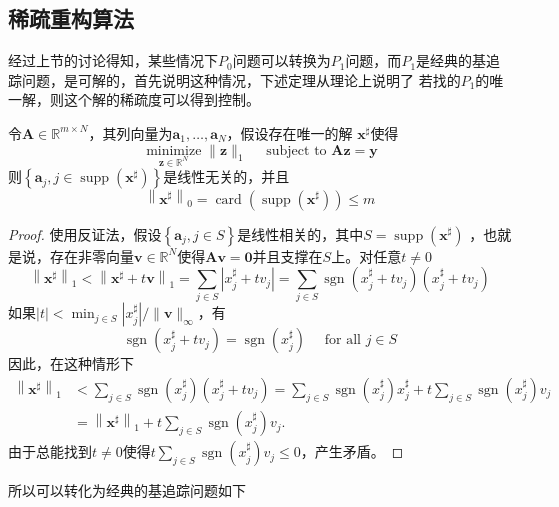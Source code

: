 \subsection{稀疏重构算法}
经过上节的讨论得知，某些情况下$P_0$问题可以转换为$P_1$问题，而$P_1$是经典的基追踪问题，是可解的，首先说明这种情况，下述定理从理论上说明了
若找的$P_1$的唯一解，则这个解的稀疏度可以得到控制。
\begin{theorem}
    令$\mathbf{A} \in \mathbb{R}^{m \times N}$，其列向量为$\mathbf{a}_1,\ldots,\mathbf{a}_N$，假设存在唯一的解
    $\mathbf{x}^{\sharp}$使得
    \begin{equation}
        \underset{\mathbf{z} \in \mathbb{R}^N}{\operatorname{minimize}}\|\mathbf{z}\|_1 \quad \text { subject to } \mathbf{A z}=\mathbf{y}
    \end{equation}
    则$\left\{\mathbf{a}_j,j \in \operatorname{supp}\left(\mathbf{x}^{\sharp}\right)\right\}$是线性无关的，并且
    \begin{equation}
        \left\|\mathbf{x}^{\sharp}\right\|_0=\operatorname{card}\left(\operatorname{supp}\left(\mathbf{x}^{\sharp}\right)\right) \leq m
    \end{equation}
\end{theorem}
\begin{proof}
    使用反证法，假设$\left\{\mathbf{a}_j,j \in S\right\}$是线性相关的，其中$S=\operatorname{supp}\left(\mathbf{x}^{\sharp}\right)$
    ，也就是说，存在非零向量$\mathbf{v} \in \mathbb{R}^N$使得$\mathbf{A v}=\mathbf{0}$并且支撑在$S$上。对任意$t \neq 0$
    \begin{equation}
        \left\|\mathbf{x}^{\sharp}\right\|_1<\left\|\mathbf{x}^{\sharp}+t \mathbf{v}\right\|_1=\sum_{j \in S}\left|x_j^{\sharp}+t v_j\right|=\sum_{j \in S} \operatorname{sgn}\left(x_j^{\sharp}+t v_j\right)\left(x_j^{\sharp}+t v_j\right)
    \end{equation}
    如果$|t|<\min _{j \in S}\left|x_j^{\sharp}\right| /\|\mathbf{v}\|_{\infty}$，有
    \begin{equation}
        \operatorname{sgn}\left(x_j^{\sharp}+t v_j\right)=\operatorname{sgn}\left(x_j^{\sharp}\right) \quad \text { for all } j \in S
    \end{equation}
    因此，在这种情形下
    \begin{equation}
        \begin{aligned}
        \left\|\mathbf{x}^{\sharp}\right\|_1 & <\sum_{j \in S} \operatorname{sgn}\left(x_j^{\sharp}\right)\left(x_j^{\sharp}+t v_j\right)=\sum_{j \in S} \operatorname{sgn}\left(x_j^{\sharp}\right) x_j^{\sharp}+t \sum_{j \in S} \operatorname{sgn}\left(x_j^{\sharp}\right) v_j \\
        & =\left\|\mathbf{x}^{\sharp}\right\|_1+t \sum_{j \in S} \operatorname{sgn}\left(x_j^{\sharp}\right) v_j .
        \end{aligned}
    \end{equation}
    由于总能找到$t \neq 0$使得$t \sum_{j \in S} \operatorname{sgn}\left(x_j^{\sharp}\right) v_j \leq 0$，产生矛盾。
\end{proof}
所以可以转化为经典的基追踪问题如下

